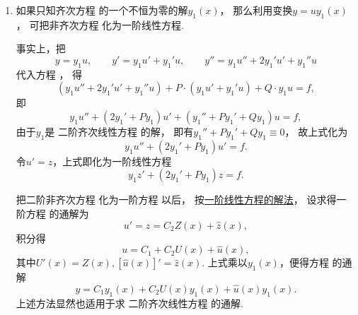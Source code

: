 \begin{enumerate}
	\item%
	如果只知齐次方程 
	的一个不恒为零的解\(y_1(x)\)，
	那么利用变换\(y = u y_1(x)\)，
	可把非齐次方程 
	化为一阶线性方程.

	事实上，把\begin{equation*}
		y = y_1 u, \qquad y' = y_1 u' + y_1' u, \qquad y'' = y_1 u'' + 2 y_1' u' + y_1'' u
	\end{equation*}
	代入方程 ，
	得\begin{equation*}
		(y_1 u'' + 2y_1' u' + y_1'' u) + P\cdot(y_1 u' + y_1' u) + Q \cdot y_1 u = f,
	\end{equation*}
	即\begin{equation*}
		y_1 u'' + (2y_1' + P y_1) u' + (y_1'' + P y_1' + Q y_1) u = f,
	\end{equation*}
	由于\(y_1\)是
	二阶齐次线性方程  的解，
	即有\(y_1'' + P y_1' + Q y_1 \equiv 0\)，
	故上式化为\begin{equation*}
		y_1 u'' + (2 y_1' + P y_1) u' = f.
	\end{equation*}
	令\(u' = z\)，上式即化为一阶线性方程
	\begin{equation}\label{equation:微分方程.降为一阶的二阶线性微分方程}
		y_1 z' + (2 y_1' + P y_1) z = f.
	\end{equation}

	把二阶非齐次方程 
	化为一阶方程  以后，
	按\hyperref[section:微分方程.一阶线性微分方程]{一阶线性方程的解法}，
	设求得一阶方程  的通解为\begin{equation*}
		u' = z = C_2 Z(x) + \hat{z}(x),
	\end{equation*}
	积分得\begin{equation*}
		u = C_1 + C_2 U(x) + \hat{u}(x),
	\end{equation*}
	其中\(U'(x) = Z(x), [\hat{u}(x)]' = \hat{z}(x)\).
	上式乘以\(y_1(x)\)，便得方程  的通解
	\begin{equation}\label{equation:微分方程.二阶非齐次线性微分方程的通解.形式2}
		y = C_1 y_1(x) + C_2 U(x) y_1(x) + \hat{u}(x) y_1(x).
	\end{equation}
	上述方法显然也适用于求
	二阶齐次线性方程  的通解.
\end{enumerate}

